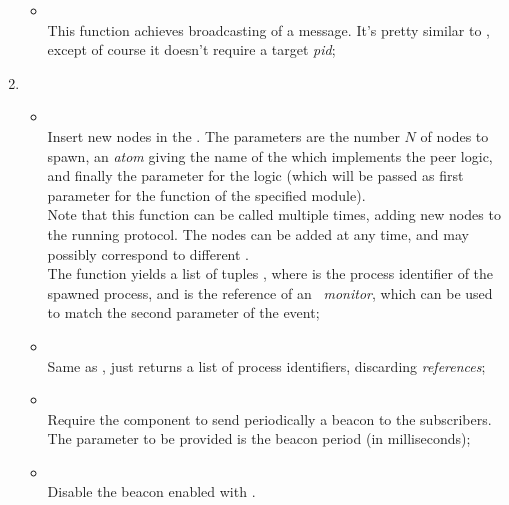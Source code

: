 \begin{enumerate}
\begin{itemize}
            \item {} \\
                This function achieves broadcasting of a message. It's
                pretty similar to , except of course it
                doesn't require a target \emph{pid};

            \end{itemize}

        \item   {}

            \begin{itemize}
            \item {} \\
                Insert new nodes in the 
                . The parameters are the number $N$ of
                nodes to spawn, an \emph{atom} giving the name of the
                 which implements the peer
                logic, and finally the parameter for the logic (which will
                be passed as first parameter for the 
                function of the specified module). \\
                Note that this function can be called multiple times,
                adding new nodes to the running protocol. The nodes can be
                added at any time, and may possibly correspond to
                different . \\
                The function yields a list of tuples ,
                where  is the process identifier of the spawned
                process, and  is the reference of an
                \emph{\Erlang\ monitor}, which can be used to match the
                second parameter of the 
                event;

            \item {} \\
                Same as , just returns a list of
                process identifiers, discarding \emph{references};

            \item {} \\
                Require the  component to send periodically a
                beacon to the subscribers. The parameter to be provided is
                the beacon period (in milliseconds);

            \item {} \\
                Disable the beacon enabled with .

            \end{itemize}

        \end{enumerate}


